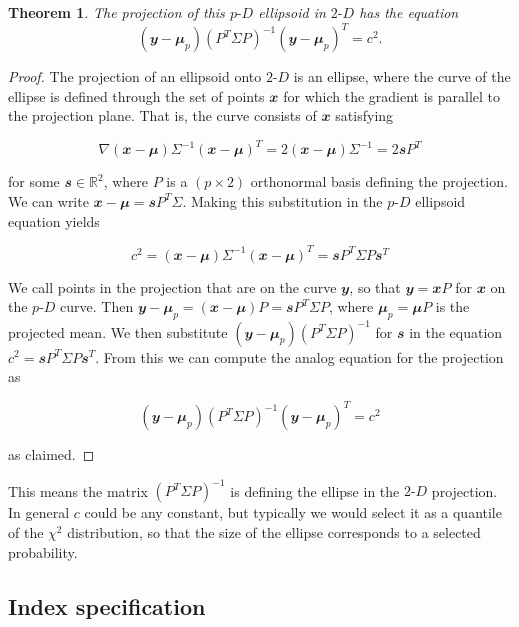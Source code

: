 \documentclass[
  12pt,
]{interact}
\newcommand\pD{$p\text{-}D$}
\newcommand\gD{$2\text{-}D$}
\newtheorem*{theorem}{Theorem}
\begin{document}
\begin{theorem}
  The projection of this \pD{} ellipsoid in \gD{} has the equation
$$(\mathbfit{y} - \mathbfit{\mu}_p)(P^T \Sigma P)^{-1}(\mathbfit{y} - \mathbfit{\mu}_p)^T = c^2.$$
\end{theorem}
\begin{proof}
The projection of an ellipsoid onto \gD{} is an ellipse, where the curve of the ellipse is defined through the set of points $\mathbfit{x}$ for which the gradient is parallel to the projection plane. That is, the curve 
consists of $\mathbfit{x}$ satisfying

$$\nabla (\mathbfit{x}-\mathbfit{\mu}) \Sigma^{-1}(\mathbfit{x}-\mathbfit{\mu})^T = 2 (\mathbfit{x}-\mathbfit{\mu}) \Sigma^{-1} = 2\mathbfit{s}P^T
$$

for some $\mathbfit{s} \in \mathbb{R}^2$, where $P$ is a $(p\times 2)$ orthonormal basis defining the
projection. We can write $\mathbfit{x}-\mathbfit{\mu} = \mathbfit{s} P^T \Sigma$.
Making this substitution in the \pD{} ellipsoid equation yields

$$c^2 = (\mathbfit{x}-\mathbfit{\mu}) \Sigma^{-1}(\mathbfit{x}-\mathbfit{\mu})^T = \mathbfit{s} P^T \Sigma P \mathbfit{s}^T
$$

We call points in the projection that are on the curve $\mathbfit{y}$, so that $\mathbfit{y} = \mathbfit{x}P$ for $\mathbfit{x}$ on the \pD{} curve. Then $\mathbfit{y} - \mathbfit{\mu}_p = (\mathbfit{x} - \mathbfit{\mu})P = \mathbfit{s} P^T \Sigma P$, where $\mathbfit{\mu}_p = \mathbfit{\mu} P$ is the projected mean. We then substitute $(\mathbfit{y} - \mathbfit{\mu}_p) (P^T \Sigma P)^{-1}$ for $\mathbfit{s}$ in the equation \(c^2 = \mathbfit{s} P^T \Sigma P \mathbfit{s}^T\). From this we can compute the analog equation for the projection as

$$(\mathbfit{y} - \mathbfit{\mu}_p)(P^T \Sigma P)^{-1}(\mathbfit{y} - \mathbfit{\mu}_p)^T = c^2$$

as claimed.
\end{proof}

This means the matrix \((P^T \Sigma P)^{-1}\) is defining the ellipse in
the \gD{} projection. In general \(c\) could be any constant, but
typically we would select it as a quantile of the \(\chi^2\)
distribution, so that the size of the ellipse corresponds to a selected
probability.

\subsection{Index specification}\label{index-specification}
\end{document}
